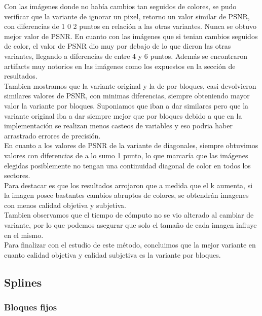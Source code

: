 \documentclass[a4paper]{article}
\newcounter{col}
\begin{document}
 Con las im\'agenes donde no hab\'ia cambios tan seguidos de colores, se pudo verificar que la variante de ignorar un pixel, retorno un valor similar de PSNR, con diferencias de 1 0 2 puntos en relaci\'on a las otras variantes. Nunca se obtuvo mejor valor de PSNR.
 En cuanto con las im\'agenes que si tenian cambios seguidos de color, el valor de PSNR dio muy por debajo de lo que dieron las otras variantes, llegando a diferencias de entre 4 y 6 puntos. Adem\'as se encontraron artifacts muy notorios en las im\'agenes como los expuestos en la secci\'on de resultados.\\
 Tambien mostramos que la variante original y la de por bloques, casi devolvieron similares valores de PSNR, con minimas diferencias, siempre obteniendo mayor valor la variante por bloques. Suponiamos que iban a dar similares pero que la variante original iba a dar siempre mejor que por bloques debido a que en la implementaci\'on se realizan menos casteos de variables y eso podria haber arrastrado errores de precisi\'on.\\
 En cuanto a los valores de PSNR de la variante de diagonales, siempre obtuvimos valores con diferencias de a lo sumo 1 punto, lo que marcar\'ia que las im\'agenes elegidas posiblemente no tengan una continuidad diagonal de color en todos los sectores.\\
 Para destacar es que los resultados arrojaron que a medida que el k aumenta, si la imagen posee bastantes cambios abruptos de colores, se obtendr\'an imagenes con menos calidad objetiva y subjetiva.\\
 Tambien observamos que el tiempo de c\'omputo no se vio alterado al cambiar de variante, por lo que podemos asegurar que solo el tamaño de cada imagen influye en el mismo.\\
 Para finalizar con el estudio de este m\'etodo, concluimos que la mejor variante en cuanto calidad objetiva y calidad subjetiva es la variante por bloques.

\subsection{Splines}
\subsubsection{Bloques fijos}
\label{Splines}
\end{document}
